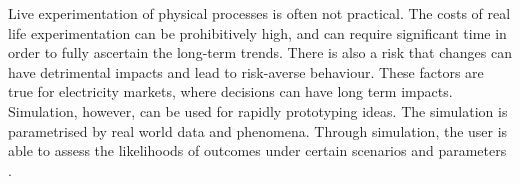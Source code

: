 

Live experimentation of physical processes is often not practical. The costs of real life experimentation can be prohibitively high, and can require significant time in order to fully ascertain the long-term trends. There is also a risk that changes can have detrimental impacts and lead to risk-averse behaviour. These factors are true for electricity markets, where decisions can have long term impacts. Simulation, however, can be used for rapidly prototyping ideas. The simulation is parametrised by real world data and phenomena. Through simulation, the user is able to assess the likelihoods of outcomes under certain scenarios and parameters \cite{Law:603360}.



